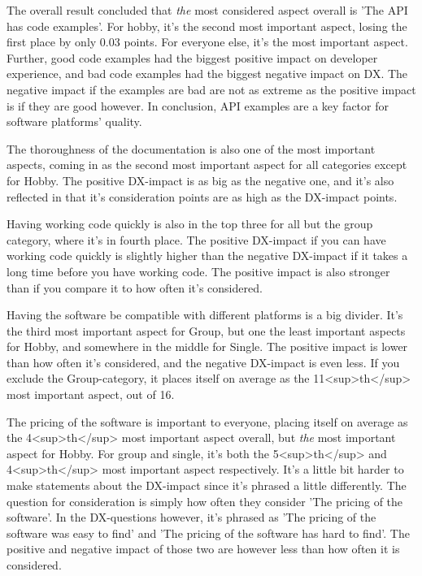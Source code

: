 \documentclass{article}
\begin{document}
The overall result concluded that \textit{the} most considered aspect overall
is 'The API has code examples'. For hobby, it's the second most
important aspect, losing the first place by only 0.03 points. For
everyone else, it's the most important aspect. Further, good code
examples had the biggest positive impact on developer experience, and
bad code examples had the biggest negative impact on DX. The negative
impact if the examples are bad are not as extreme as the positive impact
is if they are good however. In conclusion, API examples are a key
factor for software platforms' quality.

The thoroughness of the documentation is also one of the most important
aspects, coming in as the second most important aspect for all
categories except for Hobby. The positive DX-impact is as big as the
negative one, and it's also reflected in that it's consideration points
are as high as the DX-impact points.

Having working code quickly is also in the top three for all but the
group category, where it's in fourth place. The positive DX-impact if
you can have working code quickly is slightly higher than the negative
DX-impact if it takes a long time before you have working code. The
positive impact is also stronger than if you compare it to how often
it's considered.

Having the software be compatible with different platforms is a big
divider. It's the third most important aspect for Group, but one the
least important aspects for Hobby, and somewhere in the middle for
Single. The positive impact is lower than how often it's considered, and
the negative DX-impact is even less. If you exclude the Group-category,
it places itself on average as the 11<sup>th</sup> most important
aspect, out of 16.

The pricing of the software is important to everyone, placing itself on
average as the 4<sup>th</sup> most important aspect overall, but \textit{the}
most important aspect for Hobby. For group and single, it's both the
5<sup>th</sup> and 4<sup>th</sup> most important aspect respectively.
It's a little bit harder to make statements about the DX-impact since
it's phrased a little differently. The question for consideration is
simply how often they consider 'The pricing of the software'. In the
DX-questions however, it's phrased as 'The pricing of the software was
easy to find' and 'The pricing of the software has hard to find'. The
positive and negative impact of those two are however less than how
often it is considered.
\end{document}
